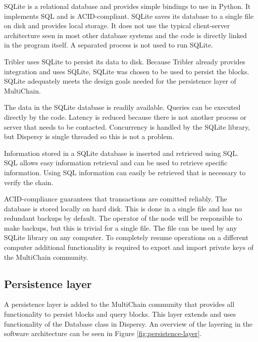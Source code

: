 SQLite is a relational database and provides simple bindings to use in Python\cite{owens-sqlite}.
It implements SQL and is ACID-compliant\cite{haerder-ACID}.
SQLite saves its database to a single file on disk and provides local storage.
It does not use the typical client-server architecture seen in most other database systems
and the code is directly linked in the program itself.
A separated process is not used to run SQLite.

Tribler uses SQLite to persist its data to disk.
Because Tribler already provides integration and uses SQLite,
SQLite was chosen to be used to persist the blocks.
SQLite adequately meets the design goals needed for the persistence layer of MultiChain.

The data in the SQLite database is readily available.
Queries can be executed directly by the code.
Latency is reduced because there is not another process or server that needs to be contacted.
Concurrency is handled by the SQLite library,
but Dispersy is single threaded so this is not a problem.

Information stored in a SQLite database is inserted and retrieved using SQL\cite{date-sql}.
SQL allows easy information retrieval and can be used to retrieve specific information.
Using SQL information can easily be retrieved that is necessary to verify the chain.

ACID-compliance guarantees that transactions are comitted reliably.
The database is stored locally on hard disk.
This is done in a single file and has no redundant backups by default.
The operator of the node will be responsible to make backups,
but this is trivial for a single file.
The file can be used by any SQLite library on any computer.
To completely resume operations on a different computer
additional functionality is required to export and import private keys of the MultiChain community.

\subsection{Persistence layer}
A persistence layer is added to the MultiChain community
that provides all functionality to persist blocks and query blocks.
This layer extends and uses functionality of the Database class in Dispersy.
An overview of the layering in the software architecture can be seen in Figure \ref{fig:persistence-layer}.

